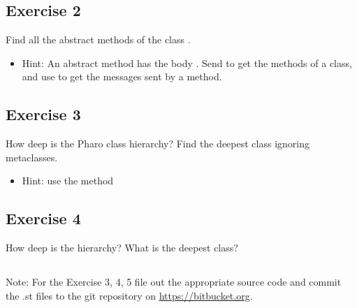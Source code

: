 \documentclass [11pt, a4wide, twoside]{article}
\begin{document}


\subsection*{Exercise 2}

Find all the abstract methods of the class .
\begin{itemize}
\item Hint: An abstract method has the body .
Send  to get the methods of a class, and use  to get the messages sent by a method.
\end{itemize}

\subsection*{Exercise 3}
How deep is the Pharo class hierarchy?
Find the deepest class ignoring metaclasses.
\begin{itemize}
\item Hint: use the method 
\end{itemize}

\subsection*{Exercise 4}
How deep is the  hierarchy?  What is the deepest class?


\subsection*{}
Note: For the Exercise 3, 4, 5 file out the appropriate source code and commit the .st files to the git repository on \href{https://bitbucket.org}{https://bitbucket.org}.
\end{document}
